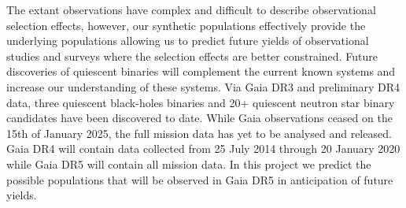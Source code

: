 \documentclass{pas}
\begin{document}
The extant observations have complex and difficult to describe observational selection effects, however, our synthetic populations effectively provide the underlying populations allowing us to predict future yields of observational studies and surveys where the selection effects are better constrained. Future discoveries of quiescent binaries will complement the current known systems and increase our understanding of these systems. Via Gaia DR3 and preliminary DR4 data, three quiescent black-holes binaries \citep{El_Badry2023-1, El_Badry2023, BH3_2024} and 20+ quiescent neutron star binary candidates \citep{elbadry2024populationneutronstarcandidates} have been discovered to date. While Gaia observations ceased on the 15th of January 2025, the full mission data has yet to be analysed and released. Gaia DR4 will contain data collected from 25 July 2014 through 20 January 2020 while Gaia DR5 will contain all mission data. In this project we predict the possible populations that will be observed in Gaia DR5 in anticipation of future yields. 
\end{document}
